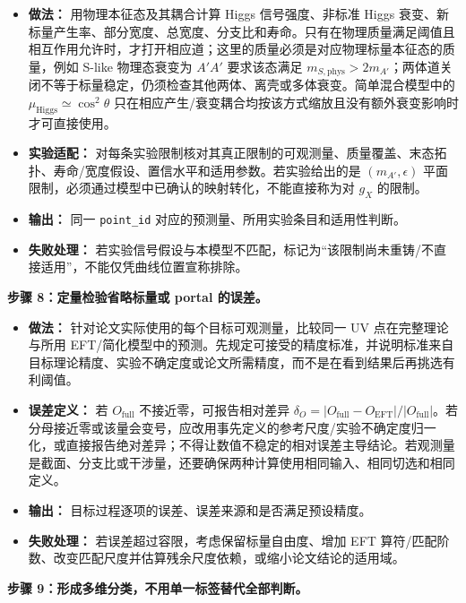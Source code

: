 \documentclass[
  chinese,
  UTF8]{ctexart}
\providecommand{\tightlist}{%
  \setlength{\itemsep}{0pt}\setlength{\parskip}{0pt}}
\begin{document}
\begin{itemize}
\tightlist
\item
  \textbf{做法：} 用物理本征态及其耦合计算 Higgs 信号强度、非标准 Higgs
  衰变、新标量产生率、部分宽度、总宽度、分支比和寿命。只有在物理质量满足阈值且相互作用允许时，才打开相应道；这里的质量必须是对应物理标量本征态的质量，例如
  S-like 物理态衰变为 \(A'A'\) 要求该态满足
  \(m_{S,\mathrm{phys}}>2m_{A'}\)；两体道关闭不等于标量稳定，仍须检查其他两体、离壳或多体衰变。简单混合模型中的
  \(\mu_{\mathrm{Higgs}}\simeq\cos^2\theta\)
  只在相应产生/衰变耦合均按该方式缩放且没有额外衰变影响时才可直接使用。
\item
  \textbf{实验适配：}
  对每条实验限制核对其真正限制的可观测量、质量覆盖、末态拓扑、寿命/宽度假设、置信水平和适用参数。若实验给出的是
  \((m_{A'},\epsilon)\)
  平面限制，必须通过模型中已确认的映射转化，不能直接称为对 \(g_X\)
  的限制。
\item
  \textbf{输出：} 同一 \texttt{point\_id}
  对应的预测量、所用实验条目和适用性判断。
\item
  \textbf{失败处理：}
  若实验信号假设与本模型不匹配，标记为``该限制尚未重铸/不直接适用''，不能仅凭曲线位置宣称排除。
\end{itemize}

\textbf{步骤 8：定量检验省略标量或 portal 的误差。}

\begin{itemize}
\tightlist
\item
  \textbf{做法：} 针对论文实际使用的每个目标可观测量，比较同一 UV
  点在完整理论与所用
  EFT/简化模型中的预测。先规定可接受的精度标准，并说明标准来自目标理论精度、实验不确定度或论文所需精度，而不是在看到结果后再挑选有利阈值。
\item
  \textbf{误差定义：} 若 \(O_{\mathrm{full}}\) 不接近零，可报告相对差异
  \(\delta_O=|O_{\mathrm{full}}-O_{\mathrm{EFT}}|/|O_{\mathrm{full}}|\)。若分母接近零或该量会变号，应改用事先定义的参考尺度/实验不确定度归一化，或直接报告绝对差异；不得让数值不稳定的相对误差主导结论。若观测量是截面、分支比或干涉量，还要确保两种计算使用相同输入、相同切选和相同定义。
\item
  \textbf{输出：} 目标过程逐项的误差、误差来源和是否满足预设精度。
\item
  \textbf{失败处理：} 若误差超过容限，考虑保留标量自由度、增加 EFT
  算符/匹配阶数、改变匹配尺度并估算残余尺度依赖，或缩小论文结论的适用域。
\end{itemize}

\textbf{步骤 9：形成多维分类，不用单一标签替代全部判断。}
\end{document}
